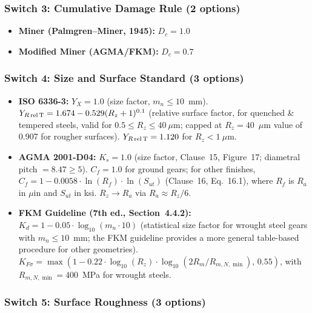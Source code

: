 \documentclass[12pt,a4paper]{article}
\begin{document}
\subsubsection{Switch 3: Cumulative Damage Rule (2 options)}

\begin{itemize}
  \item \textbf{Miner (Palmgren--Miner, 1945):} $D_c = 1.0$
  \item \textbf{Modified Miner (AGMA/FKM):} $D_c = 0.7$
\end{itemize}

\subsubsection{Switch 4: Size and Surface Standard (3 options)}

\begin{itemize}
  \item \textbf{ISO 6336-3:} $Y_X = 1.0$ (size factor, $m_n \leq 10$~mm).
        $Y_{R\,\rm rel\,T} = 1.674 - 0.529(R_z+1)^{0.1}$ (relative
        surface factor, for quenched \& tempered steels, valid for
        $0.5 \leq R_z \leq 40~\mu$m; capped at $R_z=40$~$\mu$m value
        of 0.907 for rougher surfaces). $Y_{R\,\rm rel\,T} = 1.120$
        for $R_z < 1~\mu$m.
  \item \textbf{AGMA 2001-D04:} $K_s = 1.0$ (size factor, Clause~15,
        Figure~17; diametral pitch $=8.47 \geq 5$).
        $C_f = 1.0$ for ground gears; for other finishes,
        $C_f = 1 - 0.0058 \cdot \ln(R_f) \cdot \ln(S_{ut})$
        (Clause~16, Eq.~16.1), where $R_f$ is $R_a$ in $\mu$in
        and $S_{ut}$ in ksi. $R_z \rightarrow R_a$ via
        $R_a \approx R_z/6$.
  \item \textbf{FKM Guideline (7th ed., Section~4.4.2):}
        $K_d = 1 - 0.05 \cdot \log_{10}(m_n \cdot 10)$ (statistical size
        factor for wrought steel gears with $m_n \leq 10$~mm;
        the FKM guideline provides a more general table-based procedure
        for other geometries).
        $K_{F\sigma} = \max(1 - 0.22 \cdot \log_{10}(R_z) \cdot
        \log_{10}(2R_m/R_{m,N,\min}),\, 0.55)$, with
        $R_{m,N,\min}=400$~MPa for wrought steels.
\end{itemize}

\subsubsection{Switch 5: Surface Roughness (3 options)}
\end{document}
